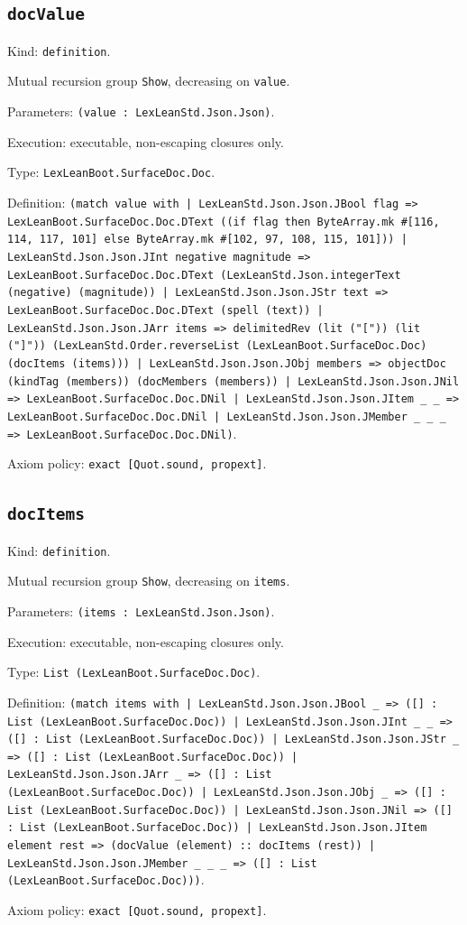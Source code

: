 \documentclass[11pt]{article}
\begin{document}
\subsection*{\texttt{docValue}}
\noindent Kind: \texttt{definition}.\par
\noindent Mutual recursion group \texttt{Show}, decreasing on \texttt{value}.\par
\noindent Parameters: \texttt{(value : LexLeanStd.Json.Json)}.\par
\noindent Execution: executable, non-escaping closures only.\par
\noindent Type: \texttt{LexLeanBoot.SurfaceDoc.Doc}.\par
\noindent Definition: \texttt{(match value with | LexLeanStd.Json.Json.JBool flag => LexLeanBoot.SurfaceDoc.Doc.DText ((if flag then ByteArray.mk \#[116, 114, 117, 101] else ByteArray.mk \#[102, 97, 108, 115, 101])) | LexLeanStd.Json.Json.JInt negative magnitude => LexLeanBoot.SurfaceDoc.Doc.DText (LexLeanStd.Json.integerText (negative) (magnitude)) | LexLeanStd.Json.Json.JStr text => LexLeanBoot.SurfaceDoc.Doc.DText (spell (text)) | LexLeanStd.Json.Json.JArr items => delimitedRev (lit ("[")) (lit ("]")) (LexLeanStd.Order.reverseList (LexLeanBoot.SurfaceDoc.Doc) (docItems (items))) | LexLeanStd.Json.Json.JObj members => objectDoc (kindTag (members)) (docMembers (members)) | LexLeanStd.Json.Json.JNil => LexLeanBoot.SurfaceDoc.Doc.DNil | LexLeanStd.Json.Json.JItem \_ \_ => LexLeanBoot.SurfaceDoc.Doc.DNil | LexLeanStd.Json.Json.JMember \_ \_ \_ => LexLeanBoot.SurfaceDoc.Doc.DNil)}.\par
\noindent Axiom policy: \texttt{exact [Quot.sound, propext]}.\par
\subsection*{\texttt{docItems}}
\noindent Kind: \texttt{definition}.\par
\noindent Mutual recursion group \texttt{Show}, decreasing on \texttt{items}.\par
\noindent Parameters: \texttt{(items : LexLeanStd.Json.Json)}.\par
\noindent Execution: executable, non-escaping closures only.\par
\noindent Type: \texttt{List (LexLeanBoot.SurfaceDoc.Doc)}.\par
\noindent Definition: \texttt{(match items with | LexLeanStd.Json.Json.JBool \_ => ([] : List (LexLeanBoot.SurfaceDoc.Doc)) | LexLeanStd.Json.Json.JInt \_ \_ => ([] : List (LexLeanBoot.SurfaceDoc.Doc)) | LexLeanStd.Json.Json.JStr \_ => ([] : List (LexLeanBoot.SurfaceDoc.Doc)) | LexLeanStd.Json.Json.JArr \_ => ([] : List (LexLeanBoot.SurfaceDoc.Doc)) | LexLeanStd.Json.Json.JObj \_ => ([] : List (LexLeanBoot.SurfaceDoc.Doc)) | LexLeanStd.Json.Json.JNil => ([] : List (LexLeanBoot.SurfaceDoc.Doc)) | LexLeanStd.Json.Json.JItem element rest => (docValue (element) :: docItems (rest)) | LexLeanStd.Json.Json.JMember \_ \_ \_ => ([] : List (LexLeanBoot.SurfaceDoc.Doc)))}.\par
\noindent Axiom policy: \texttt{exact [Quot.sound, propext]}.\par
\end{document}
